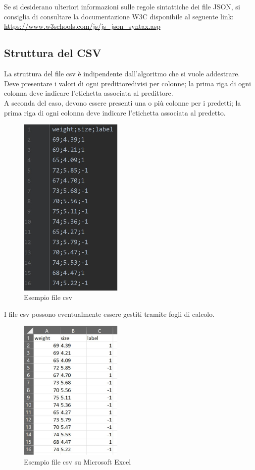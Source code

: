 		\mbox{} \\ \\ 
		Se si desiderano ulteriori informazioni sulle regole sintattiche dei file JSON, si consiglia di consultare la documentazione W3C disponibile al seguente link:
		\\[0.2cm]
		\hspace*{10mm}
		\url{https://www.w3schools.com/js/js_json_syntax.asp}
		
	\subsection{Struttura del CSV}
	La struttura del file csv è indipendente dall'algoritmo che si vuole addestrare.
	Deve presentare i valori di ogni predittore\glosp divisi per colonne; la prima riga di ogni colonna deve indicare l'etichetta associata al predittore\glo. \\
	A seconda del caso, devono essere presenti una o più colonne per i predetti; la prima riga di ogni colonna deve indicare l'etichetta associata al predetto.
	\mbox{}
	\begin{figure} [H]
		\begin{center}
			\includegraphics[width=50mm]{./img/csv1.jpg}
		\end{center}
		\caption{Esempio file csv}
	\end{figure}
	\mbox{}
	I file csv possono eventualmente essere gestiti tramite fogli di calcolo.
	\mbox{}
	\begin{figure} [H]
		\begin{center}
			\includegraphics[width=50mm]{./img/csv2.jpg}
		\end{center}
		\caption{Esempio file csv su Microsoft Excel}
	\end{figure}
	\mbox{} 
